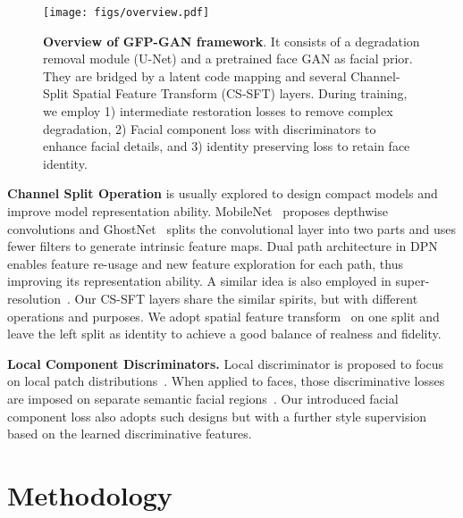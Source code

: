 \documentclass[final]{cvpr}
\begin{document}
\begin{figure*}
	\vspace{-0.6cm}
	\begin{center}
\texttt{[image: figs/overview.pdf]}
	\end{center}
	\vspace{-0.5cm}
	\caption{\textbf{Overview of GFP-GAN framework}. It consists of a degradation removal module (U-Net) and a pretrained face GAN as facial prior. They are bridged by a latent code mapping and several Channel-Split Spatial Feature Transform (CS-SFT) layers. During training, we employ 1) intermediate restoration losses to remove complex degradation, 2) Facial component loss with discriminators to enhance facial details, and 3) identity preserving loss to retain face identity.}
	\label{fig:overview}
	\vspace{-0.5cm}
\end{figure*}



\noindent\textbf{Channel Split Operation} is usually explored to design compact models and improve model representation ability.
MobileNet~\cite{howard2017mobilenets} proposes depthwise convolutions and 
GhostNet~\cite{han2020ghostnet} splits the convolutional layer into two parts and uses
fewer filters to generate intrinsic feature maps. 
Dual path architecture in DPN~\cite{chen2017dpn} enables feature re-usage and new feature exploration for each path, thus improving its representation ability. A similar idea is also employed in super-resolution~\cite{zhao2019channel}.
Our CS-SFT layers share the similar spirits, but with different operations and purposes.
We adopt spatial feature transform~\cite{wang2018sftgan,park2019spade} on one split and leave the left split as identity to achieve a good balance of realness and fidelity.

\noindent\textbf{Local Component Discriminators.}
Local discriminator is proposed to focus on local patch distributions~\cite{iizuka2017globally,li2017generative,wang2017pix2pixHD}.
When applied to faces, those discriminative losses are imposed on separate semantic facial regions~\cite{li2018beautygan,gu2019ladn}. 
Our introduced facial component loss also adopts such designs but with a further style supervision based on the learned discriminative features. 

\section{Methodology}
\end{document}
